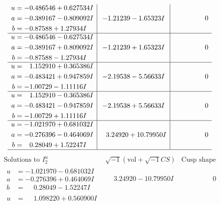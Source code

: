 \documentclass[1p]{elsarticle_modified}
\theoremstyle{definition}
\newcommand{\I}{\sqrt{-1}}
\begin{document}
$$\begin{array}{c|c|c}
\begin{aligned}
u &= -0.486546 + 0.627534 I \\
a &= -0.389167 - 0.809092 I \\
b &= -0.87588 + 1.27934 I\end{aligned}
 & -1.21239 - 1.65323 I & \phantom{-0.000000 } 0 \\ \hline\begin{aligned}
u &= -0.486546 - 0.627534 I \\
a &= -0.389167 + 0.809092 I \\
b &= -0.87588 - 1.27934 I\end{aligned}
 & -1.21239 + 1.65323 I & \phantom{-0.000000 } 0 \\ \hline\begin{aligned}
u &= \phantom{-}1.152910 + 0.365386 I \\
a &= -0.483421 + 0.947859 I \\
b &= -1.00729 - 1.11116 I\end{aligned}
 & -2.19538 - 5.56633 I & \phantom{-0.000000 } 0 \\ \hline\begin{aligned}
u &= \phantom{-}1.152910 - 0.365386 I \\
a &= -0.483421 - 0.947859 I \\
b &= -1.00729 + 1.11116 I\end{aligned}
 & -2.19538 + 5.56633 I & \phantom{-0.000000 } 0 \\ \hline\begin{aligned}
u &= -1.021970 + 0.681032 I \\
a &= -0.276396 - 0.464069 I \\
b &= \phantom{-}0.28049 + 1.52247 I\end{aligned}
 & \phantom{-}3.24920 + 10.79950 I & \phantom{-0.000000 } 0\\
 \hline 
 \end{array}$$\newpage$$\begin{array}{c|c|c}  
\text{Solutions to }I^u_{2}& \I (\text{vol} + \sqrt{-1}CS) & \text{Cusp shape}\\
 \hline 
\begin{aligned}
u &= -1.021970 - 0.681032 I \\
a &= -0.276396 + 0.464069 I \\
b &= \phantom{-}0.28049 - 1.52247 I\end{aligned}
 & \phantom{-}3.24920 - 10.79950 I & \phantom{-0.000000 } 0 \\ \hline\begin{aligned}
u &= \phantom{-}1.098220 + 0.560900 I \\

\end{aligned}
\end{array}$$
\end{document}
